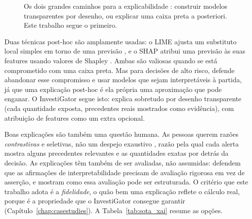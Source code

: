 \begin{figure}[ht]
\centering
{}
\caption[Taxonomia das abordagens de explicabilidade]{Os dois grandes caminhos para a explicabilidade
\autocite{arrieta2020xai, guidotti2018survey}: construir modelos transparentes por desenho, ou explicar
uma caixa preta a posteriori. Este trabalho segue o primeiro.}
\label{fig:sota_xai_taxonomy}
\end{figure}

Duas técnicas post-hoc são amplamente usadas: o LIME ajusta um substituto local simples em torno de uma
previsão \autocite{ribeiro2016lime}, e o SHAP atribui uma previsão às suas features usando valores de
Shapley \autocite{lundberg2017shap}. Ambas são valiosas quando se está comprometido com uma caixa preta.
Mas para decisões de alto risco, \textcite{rudin2019stop} defende abandonar esse compromisso e usar
modelos que sejam interpretáveis à partida, já que uma explicação post-hoc é ela própria uma aproximação
que pode enganar. O InvestiGator segue isto: explica sobretudo por desenho transparente (cada quantidade
exposta, precedentes reais mostrados como evidência), com atribuição de features como um extra opcional.

Boas explicações são também uma questão humana. As pessoas querem razões \emph{contrastivas} e seletivas,
não um despejo exaustivo \autocite{miller2019explanation}, razão pela qual cada alerta mostra alguns
precedentes relevantes e as quantidades exatas por detrás da decisão. As explicações têm também de ser
avaliadas, não assumidas: \textcite{doshivelez2017rigorous} defendem que as afirmações de
interpretabilidade precisam de avaliação rigorosa em vez de asserção, e mostram como essa avaliação pode
ser estruturada. O critério que este trabalho adota é a \emph{fidelidade}, o quão bem uma explicação
reflete o cálculo real, porque é a propriedade que o InvestiGator consegue garantir
(Capítulo~\ref{chap:casestudies}). A Tabela~\ref{tab:sota_xai} resume as opções.

